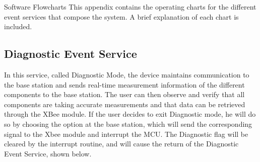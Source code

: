 \begin{customAppendixPage}{Software Flowcharts}
This appendix contains the operating charts for the different event services that compose the system.  A brief explanation of each chart is included.
\end{customAppendixPage}
\renewcommand*{\thepage}{\thesection-\arabic{page}}

\subsection{Diagnostic Event Service}

In this service, called Diagnostic Mode, the device maintains communication to the base station and sends real-time measurement information of the different components to the base station. The user can then observe and verify that all components are taking accurate measurements and that data can be retrieved through the XBee module. If the user decides to exit Diagnostic mode, he will do so by choosing the option at the base station, which will send the corresponding signal to the Xbee module and interrupt the MCU. The Diagnostic flag will be cleared by the interrupt routine, and will cause the return of the Diagnostic Event Service, shown below.


